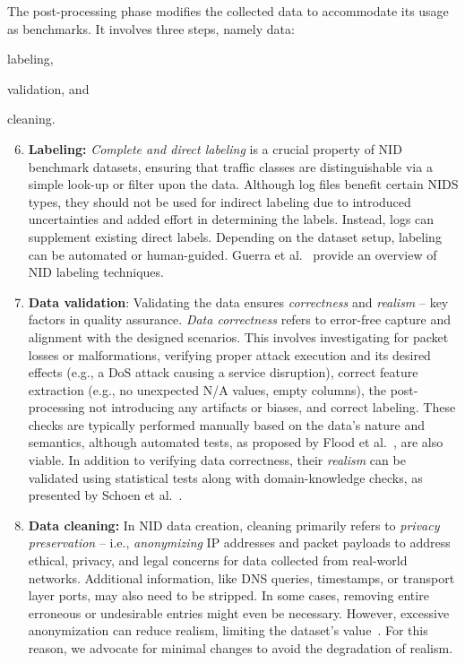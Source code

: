 The post-processing phase modifies the collected data to accommodate its usage as benchmarks. It involves three steps, namely data:
\begin{enumerate*}[label=\alph*)]
    \item labeling,
    \item validation, and
    \item cleaning.
\end{enumerate*}

\begin{enumerate}[nosep, label=\textbf{\arabic*}., topsep=0pt, wide, labelindent=\parindent, itemsep=0pt, parsep=0pt]
\setcounter{enumi}{5}

\item \textbf{Labeling:} \emph{Complete and direct labeling} is a crucial property of NID benchmark datasets, ensuring that traffic classes are distinguishable via a simple look-up or filter upon the data. Although log files benefit certain NIDS types, they should not be used for indirect labeling due to introduced uncertainties and added effort in determining the labels. Instead, logs can supplement existing direct labels. Depending on the dataset setup, labeling can be automated or human-guided. Guerra et al.~\cite{guerra2022_datasets_labeling} provide an overview of NID labeling techniques.

\item \textbf{Data validation}: Validating the data ensures \emph{correctness} and \emph{realism} -- key factors in quality assurance. \emph{Data correctness} refers to error-free capture and alignment with the designed scenarios. This involves investigating for packet losses or malformations, verifying proper attack execution and its desired effects (e.g., a DoS attack causing a service disruption), correct feature extraction (e.g., no unexpected N/A values, empty columns), the post-processing not introducing any artifacts or biases, and correct labeling. These checks are typically performed manually based on the data's nature and semantics, although automated tests, as proposed by Flood et al.~\cite{flood2024_bad_design_smells_nids_datasets}, are also viable. In addition to verifying data correctness, their \emph{realism} can be validated using statistical tests along with domain-knowledge checks, as presented by Schoen et al.~\cite{schoen2024_tale_two_methods}.

\item \textbf{Data cleaning:} In NID data creation, cleaning primarily refers to \emph{privacy preservation} -- i.e., \emph{anonymizing} IP addresses and packet payloads to address ethical, privacy, and legal concerns for data collected from real-world networks. Additional information, like DNS queries, timestamps, or transport layer ports, may also need to be stripped. In some cases, removing entire erroneous or undesirable entries might even be necessary. However, excessive anonymization can reduce realism, limiting the dataset's value~\cite{kenyon2020_public_ids_datasets_fit}. For this reason, we advocate for minimal changes to avoid the degradation of realism.
\end{enumerate}

